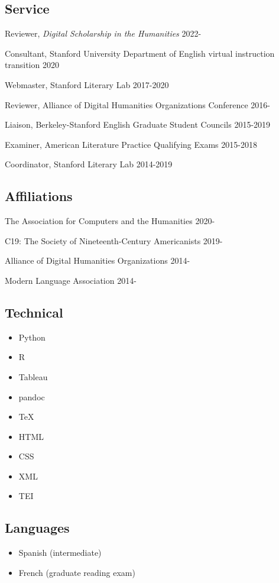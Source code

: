\documentclass[
  12pt,
  letterpaper,
]{article}
\providecommand{\tightlist}{%
  \setlength{\itemsep}{0pt}\setlength{\parskip}{0pt}}
\begin{document}
\hypertarget{service}{%
\subsection{Service}\label{service}}

Reviewer, \emph{Digital Scholarship in the Humanities} \hfill 2022-

Consultant, Stanford University Department of English virtual
instruction transition \hfill 2020

Webmaster, Stanford Literary Lab \hfill 2017-2020

Reviewer, Alliance of Digital Humanities Organizations Conference
\hfill 2016-

Liaison, Berkeley-Stanford English Graduate Student Councils
\hfill 2015-2019

Examiner, American Literature Practice Qualifying Exams \hfill 2015-2018

Coordinator, Stanford Literary Lab \hfill 2014-2019

\hypertarget{affiliations}{%
\subsection{Affiliations}\label{affiliations}}

The Association for Computers and the Humanities \hfill 2020-

C19: The Society of Nineteenth-Century Americanists \hfill 2019-

Alliance of Digital Humanities Organizations \hfill 2014-

Modern Language Association \hfill 2014-

\hypertarget{technical}{%
\subsection{Technical}\label{technical}}

\begin{itemize}
\tightlist
\item
  Python
\item
  R
\item
  Tableau
\item
  pandoc
\item
  TeX
\item
  HTML
\item
  CSS
\item
  XML
\item
  TEI
\end{itemize}

\hypertarget{languages}{%
\subsection{Languages}\label{languages}}

\begin{itemize}
\tightlist
\item
Spanish (intermediate)
\item
French (graduate reading exam)
\end{itemize}
\end{document}
